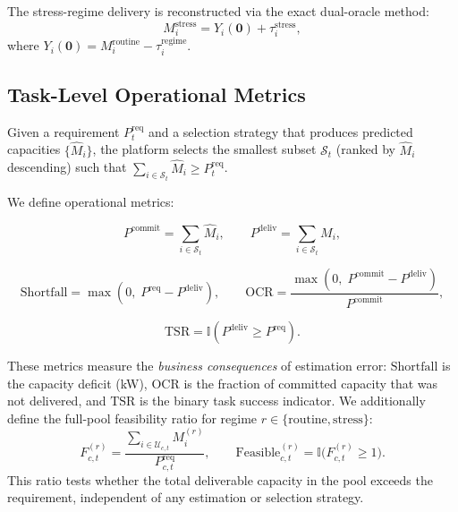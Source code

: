\documentclass[utf8]{FrontiersinHarvard}
\newcommand{\Mhat}{\widehat{M}}
\newcommand{\Preq}{P^{\mathrm{req}}}
\newcommand{\Pcommit}{P^{\mathrm{commit}}}
\newcommand{\Pdeliv}{P^{\mathrm{deliv}}}
\newcommand{\Shortfall}{\mathrm{Shortfall}}
\newcommand{\OCR}{\mathrm{OCR}}
\newcommand{\TSR}{\mathrm{TSR}}
\begin{document}
The stress-regime delivery is reconstructed via the exact
dual-oracle method:
\begin{equation}
    M_i^{\mathrm{stress}} = Y_i(\mathbf{0}) +
    \tau_i^{\mathrm{stress}},
    \label{eq:stress_reconstruction}
\end{equation}
where $Y_i(\mathbf{0}) = M_i^{\mathrm{routine}} -
\tau_i^{\mathrm{regime}}$.

\subsection{Task-Level Operational Metrics}
\label{subsec:metrics}

Given a requirement $\Preq_t$ and a selection strategy that
produces predicted capacities $\{\Mhat_i\}$, the platform selects
the smallest subset $\mathcal{S}_t$ (ranked by $\Mhat_i$
descending) such that $\sum_{i \in \mathcal{S}_t} \Mhat_i \geq
\Preq_t$.

We define operational metrics:

\begin{equation}
    \Pcommit = \textstyle\sum_{i \in \mathcal{S}_t} \Mhat_i,
    \qquad
    \Pdeliv = \textstyle\sum_{i \in \mathcal{S}_t} M_i,
\end{equation}

\begin{equation}
    \Shortfall = \max(0,\; \Preq - \Pdeliv),
    \qquad
    \OCR = \frac{\max(0,\; \Pcommit - \Pdeliv)}{\Pcommit},
\end{equation}

\begin{equation}
    \TSR = \mathbb{I}(\Pdeliv \geq \Preq).
\end{equation}

These metrics measure the \emph{business consequences} of
estimation error: $\Shortfall$ is the capacity deficit (kW),
$\OCR$ is the fraction of committed capacity that was not
delivered, and $\TSR$ is the binary task success indicator.
We additionally define the full-pool feasibility ratio for
regime $r \in \{\mathrm{routine}, \mathrm{stress}\}$:
\begin{equation}
    F_{c,t}^{(r)} = \frac{\sum_{i \in \mathcal{U}_{c,t}}
    M_i^{(r)}}{\Preq_{c,t}}, \qquad
    \mathrm{Feasible}_{c,t}^{(r)} = \mathbb{I}\!\bigl(F_{c,t}^{(r)} \geq 1\bigr).
\end{equation}
This ratio tests whether the total deliverable capacity in the
pool exceeds the requirement, independent of any estimation
or selection strategy.
\end{document}
